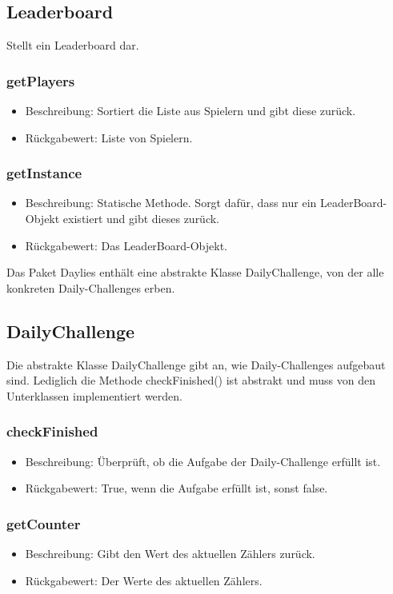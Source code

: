 \documentclass[a4paper]{scrreprt}
\begin{document}
   
   \subsection{Leaderboard}
   Stellt ein Leaderboard dar.
   
   \subsubsection{getPlayers}
   \begin{itemize}
   	\item Beschreibung: Sortiert die Liste aus Spielern und gibt diese zurück.
   	\item Rückgabewert: Liste von Spielern.
   \end{itemize}
   \subsubsection{getInstance}
   \begin{itemize}
   	\item Beschreibung: Statische Methode. Sorgt dafür, dass nur ein LeaderBoard-Objekt existiert und gibt dieses zurück.
   	\item Rückgabewert: Das LeaderBoard-Objekt.
   \end{itemize}
   
   Das Paket Daylies enthält eine abstrakte Klasse DailyChallenge, von der alle konkreten Daily-Challenges erben.
   
   \subsection{DailyChallenge}
   Die abstrakte Klasse DailyChallenge gibt an, wie Daily-Challenges aufgebaut sind. Lediglich die Methode checkFinished() ist abstrakt und muss von den Unterklassen implementiert werden.
   \subsubsection{checkFinished}
   \begin{itemize}
     \item Beschreibung: Überprüft, ob die Aufgabe der Daily-Challenge erfüllt ist.
     \item Rückgabewert: True, wenn die Aufgabe erfüllt ist, sonst false.
    \end{itemize}
   \subsubsection{getCounter}
   \begin{itemize}
     \item Beschreibung: Gibt den Wert des aktuellen Zählers zurück.
     \item Rückgabewert: Der Werte des aktuellen Zählers.
    \end{itemize}
\end{document}
